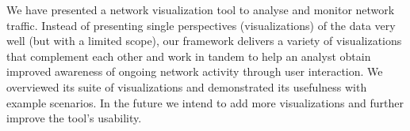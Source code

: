 We have presented a network visualization tool to analyse and monitor network traffic. Instead of presenting single perspectives (visualizations) of the data very well (but with a limited scope), our framework delivers a variety of visualizations that complement each other and work in tandem to help an analyst obtain improved awareness of ongoing network activity through user interaction. We overviewed its suite of visualizations and demonstrated its usefulness with example scenarios. In the future we intend to add more visualizations and further improve the tool's usability.
